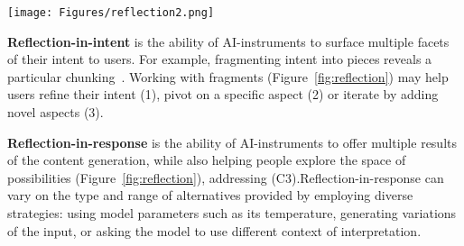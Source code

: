 \begin{figure*}[t]
    \centering
\texttt{[image: Figures/reflection2.png]}
\caption{Reflection-in-intent enables users to gain awareness of the possible  formulations of their intent while reflection-in-response enables users to assess the space of possibilities of the outputs generated by the model given an input. These aspects may help users address the challenges of intent disambiguation, resolution and steering.}
    \label{fig:reflection}
\end{figure*}


\textbf{Reflection-in-intent} is the ability of AI-instruments to surface multiple facets of their intent to users. For example,  fragmenting intent into pieces reveals a particular chunking~\cite{buxton1995chunking}. Working with fragments (Figure~\ref{fig:reflection}) may help users refine their intent (1), pivot on a specific aspect (2) or iterate by adding novel aspects (3).



\textbf{Reflection-in-response} is the ability of AI-instruments to offer multiple results of the content generation, while also helping people explore the space of possibilities (Figure~\ref{fig:reflection}), addressing (C3).Reflection-in-response can vary on the type and range of alternatives provided by employing diverse strategies: using model parameters such as its temperature, generating variations of the input, or asking the model to use different context of interpretation. 




